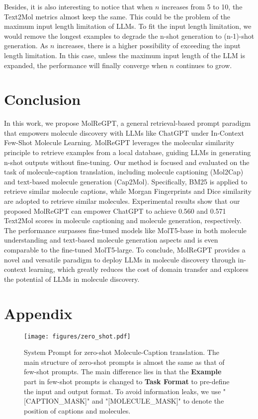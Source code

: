 \documentclass{article}
\theoremstyle{plain}
\theoremstyle{definition}
\theoremstyle{remark}
\begin{document}
Besides, it is also interesting to notice that when $n$ increases from 5 to 10, the Text2Mol metrics almost keep the same.
This could be the problem of the maximum input length limitation of LLMs. To fit the input length limitation, we would remove the longest examples to degrade the n-shot generation to (n-1)-shot generation. As $n$ increases, there is a higher possibility of exceeding the input length limitation. In this case, unless the maximum input length of the LLM is expanded, the performance will finally converge when $n$ continues to grow.




 
\section{Conclusion}
\label{sec:conclusion}
In this work, we propose MolReGPT, a general retrieval-based prompt paradigm that empowers molecule discovery with LLMs like ChatGPT under In-Context Few-Shot Molecule Learning. MolReGPT leverages the molecular similarity principle to retrieve examples from a local database, guiding LLMs in generating n-shot outputs without fine-tuning. Our method is focused and evaluated on the task of molecule-caption translation, including molecule captioning (Mol2Cap) and text-based molecule generation (Cap2Mol). Specifically, BM25 is applied to retrieve similar molecule captions, while Morgan Fingerprints and Dice similarity are adopted to retrieve similar molecules. 
Experimental results show that our proposed MolReGPT can empower ChatGPT to achieve 0.560 and 0.571 Text2Mol scores in molecule captioning and molecule generation, respectively.
The performance surpasses fine-tuned models like MolT5-base in both molecule understanding and text-based molecule generation aspects and is even comparable to the fine-tuned MolT5-large.
To conclude, MolReGPT provides a novel and versatile paradigm to deploy LLMs in molecule discovery through in-context learning, which greatly reduces the cost of domain transfer and explores the potential of LLMs in molecule discovery. 




\newpage
\appendix
\onecolumn
\section{Appendix}

\begin{figure*}[htbp]
\centering
   \texttt{[image: figures/zero\_shot.pdf]}
    \caption{System Prompt for zero-shot Molecule-Caption translation.  The main structure of zero-shot prompts is almost the same as that of few-shot prompts. The main difference lies in that the \textbf{Example} part in few-shot prompts is changed to \textbf{Task Format} to pre-define the input and output format. To avoid information leaks, we use "[CAPTION\_MASK]" and "[MOLECULE\_MASK]" to denote the position of captions and molecules.}
   \label{fig:zero_shot}
\end{figure*}
\end{document}
